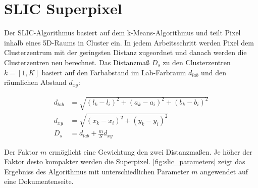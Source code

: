 \section{SLIC Superpixel}
Der SLIC-Algorithmus basiert auf dem k-Means-Algorithmus und teilt Pixel inhalb eines 5D-Raums in Cluster ein. 
In jedem Arbeitsschritt werden Pixel dem Clusterzentrum mit der geringsten Distanz zugeordnet und danach werden die Clusterzentren neu berechnet.
Das Distanzmaß \(D_s\) zu den Clusterzentren \(k=[1,K]\) basiert auf den Farbabstand im Lab-Farbraum \(d_{lab}\) und den räumlichen Abstand \(d_{xy}\):

\begin{align}
    d_{lab} &= \sqrt{ \left( l_k - l_i \right)^2 + \left( a_k - a_i \right)^2 + \left( b_k - b_i \right)^2 }\\
    d_{xy}  &= \sqrt{ \left( x_k - x_i \right)^2 + \left(y_k - y_i \right)^2 }\\
    D_{s}   &= d_{lab} + \frac{m}{S} d_{xy}
\end{align}

Der Faktor \(m\) ermöglicht eine Gewichtung den zwei Distanzmaßen. Je höher
der Faktor desto kompakter werden die Superpixel. \cref{fig:slic_parameters}
zeigt das Ergebniss des Algorithmus mit unterschiedlichen Parameter  \(m\)
angewendet auf eine Dokumentenseite.

